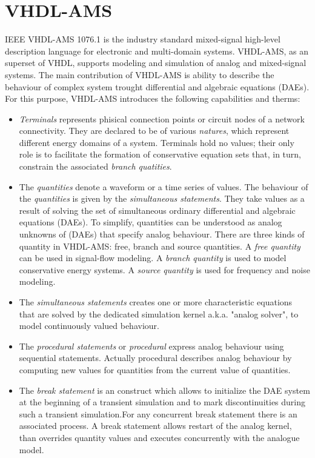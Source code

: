 \documentclass{article}
\begin{document}
\section{VHDL-AMS}
\label{sec:vhdlams}
IEEE VHDL-AMS 1076.1 is the industry standard mixed-signal
high-level description language for electronic and multi-domain
systems. VHDL-AMS, as an superset of VHDL, supports modeling and
simulation of analog and mixed-signal systems. The main contribution
of VHDL-AMS is ability to describe the behaviour of complex system
trought differential and algebraic equations (DAEs). For this purpose,
VHDL-AMS introduces the following capabilities and therms:

\begin{itemize}
\item
\emph{Terminals} represents phisical connection points or circuit nodes
of a network connectivity. They are declared to be of various
\emph{natures}, which represent different energy domains of a system.
Terminals hold no values; their only role is to facilitate the formation
of conservative equation sets that, in turn, constrain the associated
\emph{branch quatities}.
\item
The \emph{quantities} denote a waveform or a time series of values.
The behaviour of the \emph{quantities} is given by the \emph{simultaneous
 statements}. They take values as a result of solving the set of simultaneous
ordinary differential and algebraic equations (DAEs). To simplify,
quantities can be understood as analog unknowns of (DAEs) that specify
analog behaviour. There are three kinds of quantity in VHDL-AMS: free,
branch and source quantities. A \emph{free quantity} can be used in
signal-flow modeling. A \emph{branch quantity} is used to model conservative energy
systems. A \emph{source quantity} is used for frequency and noise modeling.
\item
The \emph{simultaneous statements} creates one or more characteristic
equations that are solved by the dedicated simulation kernel a.k.a.
"analog solver", to model continuously valued behaviour. 
\item
The \emph{procedural statements} or \emph{procedural} express analog behaviour
using sequential statements. Actually procedural describes analog behaviour
by computing new values for quantities from the current value of quantities.
\item
The \emph{break statement} is an construct which allows to
initialize the DAE system at the beginning of a transient
simulation and to mark discontinuities during such a transient
simulation.For any concurrent break statement there is an associated process.
A break statement allows restart of the analog kernel,
than overrides quantity values and executes concurrently with the analogue model.

\end{itemize}
 
\end{document}
